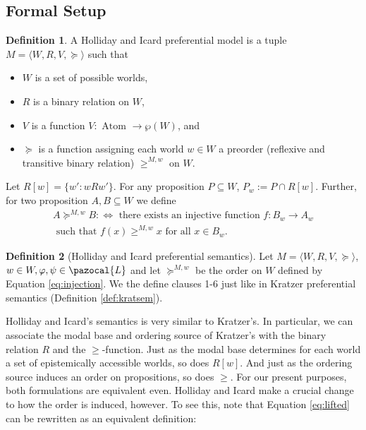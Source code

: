 \documentclass{article}
\theoremstyle{definition}
\newtheorem{definition}{Definition}
\renewcommand{\L}{\pazocal{L}}
\begin{document}
\subsection{Formal Setup}
\begin{definition}
    A Holliday and Icard preferential model is a tuple $M = {\langle
      W,R,V,\succeq\rangle}$ such that
    \begin{itemize}[nosep]
        \renewcommand\labelitemi{--}
      \item $W$ is a set of possible worlds,
      \item $R$ is a binary relation on $W$,
      \item $V$ is a function $V: \text{ Atom } \rightarrow \wp(W)$, and
      \item $\succeq$ is a function assigning each world $w \in W$ a preorder
        (reflexive and transitive binary relation) $\geq^{M,w}$ on $W$. 
    \end{itemize}
\end{definition}
Let $R[w] = \{w':wRw'\}$. For any proposition $P \subseteq W$, $P_w := P \cap R[w]$. Further, for two proposition $A,B \subseteq W$ we define
\begin{multline}
    \label{eq:injection}A \succeq^{M,w} B :\iff \text{ there exists an injective function } f: B_w \rightarrow A_w \\ \text{ such that } f(x) \geq^{M,w} x \text{ for all } x \in B_w.
\end{multline}

\begin{definition}[Holliday and Icard preferential semantics] Let $M = {\langle
      W,R,V,\succeq \rangle}$, $w \in W, \varphi,\psi \in \L$ and let $\succeq^{M,w}$ be the order on $W$ defined by Equation \ref{eq:injection}. We the define clauses 1-6 just like in Kratzer preferential semantics (Definition \ref{def:kratsem}).
\end{definition}

Holliday and Icard's semantics is very similar to Kratzer's.
In particular, we can associate the modal base and ordering source of Kratzer's with the binary relation $R$ and the $\geq$-function.
Just as the modal base determines for each world a set of epistemically accessible worlds, so does $R[w]$.
And just as the ordering source induces an order on propositions, so does $\geq$.
For our present purposes, both formulations are equivalent even.
Holliday and Icard make a crucial change to how the order is induced, however.
To see this, note that Equation \ref{eq:lifted} can be rewritten as an equivalent definition:
\end{document}
